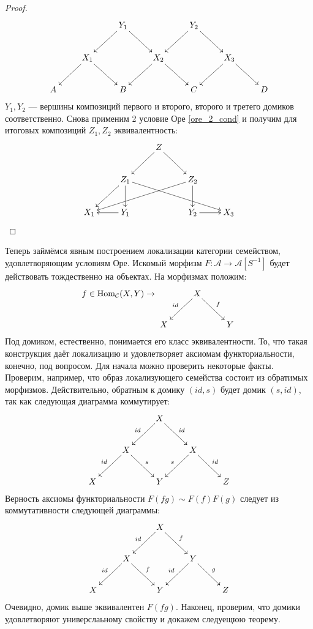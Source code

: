 \documentclass[../main.tex]{subfiles}
\begin{document}
\begin{proof}
  \begin{equation*}
    \xymatrix{&&Y_1\ar[ld]\ar[rd]&&Y_2\ar[ld]\ar[rd]\\
      &X_1\ar[rd]\ar[ld]&&X_2\ar[rd]\ar[ld]&&X_3\ar[ld]\ar[rd]\\
    A&&B&&C&&D}
  \end{equation*}
  $Y_1, Y_2$ --- вершины композиций первого и второго, второго и третего домиков соответственно. Снова применим 2 условие Оре \eqref{ore_2_cond} и получим для итоговых композиций $Z_1, Z_2$ эквивалентность:
  \begin{equation*}
    \xymatrix{&&Z\ar[rd]\ar[ld]\\
      &Z_1\ar[dl]\ar[d]\ar[rrrd]&&Z_2\ar[d]\ar[llld]\\
    X_1&Y_1\ar[l]&&Y_2\ar[r]&X_3}
  \end{equation*}
    \end{proof}
Теперь займёмся явным построением локализации категории семейством, удовлетворяющим условиям Оре.  Искомый морфизм $F:\mathcal{A} \to \mathcal{A}[S^{-1}]$ будет действовать тождественно на объектах.  На морфизмах положим:
       \begin{equation}\label{ore_functor}
	 f\in \text{Hom}_\mathcal{C}(X,Y) \to \xymatrix{&X\ar[ld]_{id}\ar[rd]^{f}\\X&&Y}
      \end{equation}
Под домиком, естественно, понимается его класс эквивалентности.  То, что такая конструкция даёт локализацию и удовлетворяет аксиомам функториальности, конечно, под вопросом.  Для начала можно проверить некоторые факты. Проверим, например, что образ локализующего семейства состоит из обратимых морфизмов. Действительно, обратным к домику $(id, s)$ будет домик $(s, id)$, так как следующая диаграмма коммутирует:
\begin{equation*}
	\xymatrix{&&X\ar[rd]^{id}\ar[ld]_{id}\\
	  &X\ar[rd]^s\ar[ld]_{id}&&X\ar[rd]^{id}\ar[ld]_s\\
	X&&Y&&Z}
	\end{equation*}
Верность аксиомы функториальности $F(fg) \sim F(f)F(g)$ следует из коммутативности следующей диаграммы:
      \begin{equation*}
	\xymatrix{&&X\ar[ld]_{id}\ar[rd]^f\\
	  &X\ar[ld]_{id}\ar[rd]^f&&Y\ar[rd]^g\ar[ld]_{id}\\
	X&&Y&&Z}
\end{equation*}
Очевидно, домик выше эквивалентен $F(fg)$. Наконец, проверим, что домики удовлетворяют универслаьному свойству и докажем следуещюю теорему.
\end{document}
